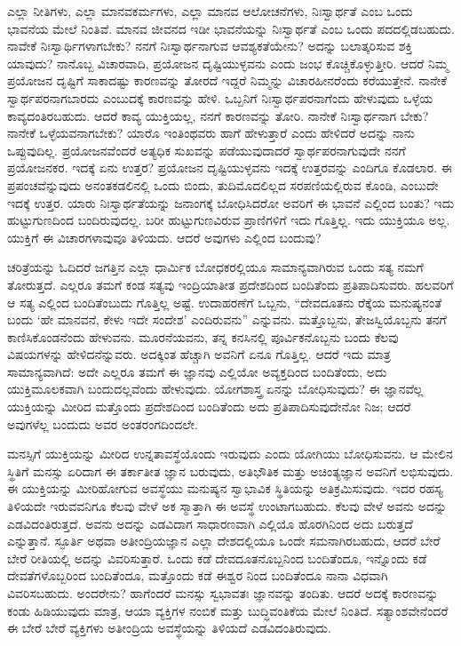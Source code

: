 ಎಲ್ಲಾ ನೀತಿಗಳು, ಎಲ್ಲಾ ಮಾನವಕರ್ಮಗಳು, ಎಲ್ಲಾ ಮಾನವ ಆಲೋಚನೆಗಳು, ನಿಃಸ್ವಾರ್ಥತೆ ಎಂಬ ಒಂದು ಭಾವನೆಯ ಮೇಲೆ ನಿಂತಿವೆ. ಮಾನವ ಜೀವನದ ಇಡೀ ಭಾವನೆಯನ್ನು ನಿಃಸ್ವಾರ್ಥತೆ ಎಂಬ ಒಂದು ಪದದಲ್ಲಿಡಬಹುದು. ನಾವೇಕೆ ನಿಃಸ್ವಾರ್ಥಿಗಳಾಗಬೇಕು? ನನಗೆ ನಿಃಸ್ವಾರ್ಥನಾಗುವ ಆವಶ್ಯಕತೆಯೇನು? ಅದನ್ನು ಬಲಾತ್ಕರಿಸುವ ಶಕ್ತಿ ಯಾವುದು? ನಾನೊಬ್ಬ ವಿಚಾರವಾದಿ, ಪ್ರಯೋಜನ ದೃಷ್ಟಿಯುಳ್ಳವನು ಎಂದು ಜಂಭ ಕೊಚ್ಚಿಕೊಳ್ಳುತ್ತೀರಿ. ಆದರೆ ನಿಮ್ಮ ಪ್ರಯೋಜನ ದೃಷ್ಟಿಗೆ ಸಾಕಾದಷ್ಟು ಕಾರಣವನ್ನು ತೋರದೆ ಇದ್ದರೆ ನಿಮ್ಮನ್ನು ವಿಚಾರಹೀನರೆಂದು ಕರೆಯುತ್ತೇನೆ. ನಾನೇಕೆ ಸ್ವಾರ್ಥಪರನಾಗಬಾರದು ಎಂಬುದಕ್ಕೆ ಕಾರಣವನ್ನು ಹೇಳಿ. ಒಬ್ಬನಿಗೆ ನಿಃಸ್ವಾರ್ಥಪರನಾಗೆಂದು ಹೇಳುವುದು ಒಳ್ಳೆಯ ಕಾವ್ಯದಂತಿರಬಹುದು. ಆದರೆ ಕಾವ್ಯ ಯುಕ್ತಿಯಲ್ಲ, ನನಗೆ ಕಾರಣವನ್ನು ತೋರಿ. ನಾನೇಕೆ ನಿಃಸ್ವಾರ್ಥನಾಗ ಬೇಕು? ನಾನೇಕೆ ಒಳ್ಳೆಯವನಾಗಬೇಕು? ಯಾರೊ ಇಂತಿಂಥವರು ಹಾಗೆ ಹೇಳುತ್ತಾರೆ ಎಂದು ಹೇಳಿದರೆ ಅದನ್ನು ನಾನು ಒಪ್ಪುವುದಿಲ್ಲ. ಪ್ರಯೋಜನವೆಂದರೆ ಅತ್ಯಧಿಕ ಸುಖವನ್ನು ಪಡೆಯುವುದಾದರೆ ಸ್ವಾರ್ಥಪರನಾಗುವುದೇ ನನಗೆ ಪ್ರಯೋಜನಕರ. ಇದಕ್ಕೆ ಏನು ಉತ್ತರ? ಪ್ರಯೋಜನ ದೃಷ್ಟಿಯುಳ್ಳವನು ಇದಕ್ಕೆ ಉತ್ತರವನ್ನು ಎಂದಿಗೂ ಕೊಡಲಾರ. ಈ ಪ್ರಪಂಚವೆನ್ನುವುದು ಅನಂತಕಡಲಿನಲ್ಲಿ ಒಂದು ಬಿಂದು, ತುದಿಮೊದಲಿಲ್ಲದ ಸರಪಣಿಯಲ್ಲಿರುವ ಕೊಂಡಿ, ಎಂಬುದೇ ಇದಕ್ಕೆ ಉತ್ತರ. ಯಾರು ನಿಃಸ್ವಾರ್ಥತೆಯನ್ನು ಜನಾಂಗಕ್ಕೆ ಬೋಧಿಸಿದರೋ ಅವರಿಗೆ ಈ ಭಾವನೆ ಎಲ್ಲಿಂದ ಬಂತು? ಇದು ಹುಟ್ಟುಗುಣದಿಂದ ಬಂದಿರುವುದಲ್ಲ. ಬರೀ ಹುಟ್ಟುಗುಣವಿರುವ ಪ್ರಾಣಿಗಳಿಗೆ ಇದು ಗೊತ್ತಿಲ್ಲ. ಇದು ಯುಕ್ತಿಯೂ ಅಲ್ಲ. ಯುಕ್ತಿಗೆ ಈ ವಿಚಾರಗಳಾವುವೂ ತಿಳಿಯದು. ಆದರೆ ಅವುಗಳು ಎಲ್ಲಿಂದ ಬಂದುವು?

ಚರಿತ್ರೆಯನ್ನು ಓದಿದರೆ ಜಗತ್ತಿನ ಎಲ್ಲಾ ಧಾರ್ಮಿಕ ಬೋಧಕರಲ್ಲಿಯೂ ಸಾಮಾನ್ಯವಾಗಿರುವ ಒಂದು ಸತ್ಯ ನಮಗೆ ತೋರುತ್ತದೆ. ಎಲ್ಲರೂ ತಮಗೆ ಕಂಡ ಸತ್ಯವು ಇಂದ್ರಿಯಾತೀತ ಪ್ರದೇಶದಿಂದ ಬಂದಿತೆಂದು ಪ್ರತಿಪಾದಿಸುವರು. ಹಲವರಿಗೆ ಆ ಸತ್ಯ ಎಲ್ಲಿಂದ ಬಂದಿತೆಂಬುದು ಗೊತ್ತಿಲ್ಲ ಅಷ್ಟೆ. ಉದಾಹರಣೆಗೆ ಒಬ್ಬನು, “ದೇವದೂತನು ರೆಕ್ಕೆಯ ಮನುಷ್ಯನಂತೆ ಬಂದು ‘ಹೇ ಮಾನವನೆ, ಕೇಳು ಇದೇ ಸಂದೇಶ’ ಎಂದಿರುವನು” ಎನ್ನುವನು. ಮತ್ತೊಬ್ಬನು, ತೇಜಸ್ವಿಯೊಬ್ಬನು ತನಗೆ ಕಾಣಿಸಿಕೊಂಡನೆಂದು ಹೇಳುವನು. ಮೂರನೆಯವನು, ತನ್ನ ಕನಸಿನಲ್ಲಿ ಪೂರ್ವಿಕನೊಬ್ಬನು ಬಂದು ಕೆಲವು ವಿಷಯಗಳನ್ನು ಹೇಳಿದನೆನ್ನುವರು. ಅದಕ್ಕಿಂತ ಹೆಚ್ಚಾಗಿ ಅವನಿಗೆ ಏನೂ ಗೊತ್ತಿಲ್ಲ. ಆದರೆ ಇದು ಮಾತ್ರ ಸಾಮಾನ್ಯವಾಗಿದೆ: ಅದೇ ಎಲ್ಲರೂ ತಮಗೆ ಈ ಜ್ಞಾನವು ಎಲ್ಲಿಯೋ ಅವ್ಯಕ್ತದಿಂದ ಬಂದಿತೆಂದು, ಅದು ಯುಕ್ತಿಮೂಲಕವಾಗಿ ಬಂದುದಲ್ಲವೆಂದು ಹೇಳುವುದು. ಯೋಗಶಾಸ್ತ್ರ ಏನನ್ನು ಬೋಧಿಸುವುದು? ಈ ಜ್ಞಾನವೆಲ್ಲ ಯುಕ್ತಿಯನ್ನು ಮೀರಿದ ಮತ್ತೊಂದು ಪ್ರದೇಶದಿಂದ ಬಂದಿತೆಂದು ಅದು ಪ್ರತಿಪಾದಿಸುವುದೇನೋ ನಿಜ; ಆದರೆ ಅವುಗಳೆಲ್ಲ ಬಂದುದು ಅವರ ಅಂತರಂಗದಿಂದಲೇ. 

ಮನಸ್ಸಿಗೆ ಯುಕ್ತಿಯನ್ನು ಮೀರಿದ ಉನ್ನತಾವಸ್ಥೆಯೊಂದು ಇರುವುದು ಎಂದು ಯೋಗಿಯು ಬೋಧಿಸುವನು. ಆ ಮೇಲಿನ ಸ್ಥಿತಿಗೆ ಮನಸ್ಸು ಏರಿದಾಗ ಈ ತರ್ಕಾತೀತ ಜ್ಞಾನ ಬರುವುದು, ಅತಿಭೌತಿಕ ಮತ್ತು ಅಚಿಂತ್ಯಜ್ಞಾನ ಅವನಿಗೆ ಲಭಿಸುವುದು. ಈ ಯುಕ್ತಿಯನ್ನು ಮೀರಿಹೋಗುವ ಅವಸ್ಥೆಯು ಮನುಷ್ಯನ ಸ್ವಾಭಾವಿಕ ಸ್ಥಿತಿಯನ್ನು ಅತಿಕ್ರಮಿಸುವುದು. ಇದರ ರಹಸ್ಯ ತಿಳಿಯದೇ ಇರುವವನಿಗೂ ಕೆಲವು ವೇಳೆ ಅಕ ಸ್ಮಾತ್ತಾಗಿ ಈ ಅವಸ್ಥೆ ಉಂಟಾಗಬಹುದು. ಕೆಲವು ವೇಳೆ ಅವನು ಅದನ್ನು ಎಡವಿದಂತಿರುತ್ತದೆ. ಅವನು ಅದನ್ನು ಎಡವಿದಾಗ ಸಾಧಾರಣವಾಗಿ ಎಲ್ಲಿಯೊ ಹೊರಗಿನಿಂದ ಅದು ಬರುತ್ತದೆ ಎನ್ನುತ್ತಾನೆ. ಸ್ಫೂರ್ತಿ ಅಥವಾ ಅತೀಂದ್ರಿಯಜ್ಞಾನ ಎಲ್ಲಾ ದೇಶದಲ್ಲಿಯೂ ಒಂದೇ ಸಮನಾಗಿರಬಹುದು, ಆದರೆ ಬೇರೆ ಬೇರೆ ರೀತಿಯಲ್ಲಿ ಅದನ್ನು ವಿವರಿಸುತ್ತಾರೆ. ಒಂದು ಕಡೆ ದೇವದೂತನೊಬ್ಬನಿಂದ ಬಂದಿತೆಂದೂ, ಇನ್ನೊಂದು ಕಡೆ ದೇವತೆಗಳೊಬ್ಬರಿಂದ ಬಂದಿತೆಂದೂ, ಮತ್ತೊಂದು ಕಡೆ ಈಶ್ವರ ನಿಂದ ಬಂದಿತೆಂದೂ ನಾನಾ ವಿಧವಾಗಿ ವಿವರಿಸಬಹುದು. ಅಂದರೇನು? ಹಾಗೆಂದರೆ ಮನಸ್ಸು ಸ್ವಭಾವತಃ ಜ್ಞಾನವನ್ನು ತಂದಿತು. ಆದರೆ ಅದಕ್ಕೆ ಕಾರಣವನ್ನು ಕಂಡು ಹಿಡಿಯುವುದು ಮಾತ್ರ, ಆಯಾ ವ್ಯಕ್ತಿಗಳ ನಂಬಿಕೆ ಮತ್ತು ಬುದ್ಧಿವಂತಿಕೆಯ ಮೇಲೆ ನಿಂತಿದೆ. ಸತ್ಯಾಂಶವೇನೆಂದರೆ ಈ ಬೇರೆ ಬೇರೆ ವ್ಯಕ್ತಿಗಳು ಅತೀಂದ್ರಿಯ ಅವಸ್ಥೆಯನ್ನು ತಿಳಿಯದೆ ಎಡವಿದಂತಿರುವುದು. 

